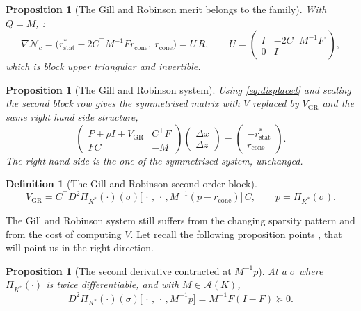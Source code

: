 \documentclass[a4paper,11pt]{book}
\theoremstyle{plain}
\newtheorem{proposition}[theorem]{Proposition}
\theoremstyle{definition}
\newtheorem{definition}[theorem]{Definition}
\theoremstyle{remark}
\numberwithin{equation}{chapter}
\numberwithin{algorithm}{chapter}
\newcommand{\proj}[2]{\Pi_{#2}\!\left(#1\right)}
\begin{document}
	\begin{proposition}[The Gill and Robinson merit belongs to the family]
		With $Q=M$, :
		\begin{equation}
			\nabla\mathcal{N}_c
			=\bigl(r^{*}_{\mathrm{stat}}-2C^\top M^{-1}Fr_{\mathrm{cone}},\
			r_{\mathrm{cone}}\bigr)=U\,R,
			\qquad
			U=\begin{pmatrix}I & -2C^\top M^{-1}F\\ 0 & I\end{pmatrix} ,
		\end{equation}
		which is block upper triangular and invertible.
	\end{proposition}
	
	\begin{proposition}[The Gill and Robinson system]
		Using \eqref{eq:displaced} and scaling the second block row gives the
		symmetrised matrix with $V$ replaced by $V_{\mathrm{GR}}$ and the same right
		hand side structure,
		\begin{equation}
			\begin{pmatrix}
				P+\rho I+V_{\mathrm{GR}} & C^\top F\\
				FC & -M
			\end{pmatrix}
			\begin{pmatrix}\Delta x\\ \Delta z\end{pmatrix}
			=\begin{pmatrix}-r^{*}_{\mathrm{stat}}\\ r_{\mathrm{cone}}\end{pmatrix} .
		\end{equation}
		The right hand side is the one of the symmetrised system, unchanged.
	\end{proposition}
	
	\begin{definition}[The Gill and Robinson second order block]
		\begin{equation}
			V_{\mathrm{GR}}=C^\top D^2\proj{\cdot}{K^*}(\sigma)
			\bigl[\,\cdot\,,\,\cdot\,,M^{-1}(p-r_{\mathrm{cone}})\bigr]\,C ,
			\qquad p=\proj{\sigma}{K^*} .
		\end{equation}
	\end{definition}
	
	The Gill and Robinson system still suffers from the changing sparsity pattern
	and from the cost of computing $V$. Let recall the following proposition points , that will point us in the right
	direction. 
	
	\begin{proposition}[The second derivative contracted at $M^{-1}p$]
		At a $\sigma$ where $\proj{\cdot}{K^*}$ is twice differentiable, and with
		$M\in\mathcal{A}(K)$,
		\begin{equation}
			D^2\proj{\cdot}{K^*}(\sigma)\bigl[\,\cdot\,,\,\cdot\,,M^{-1}p\bigr]
			=M^{-1}F(I-F)\succeq0 .
		\end{equation}
	\end{proposition}
	
\end{document}
